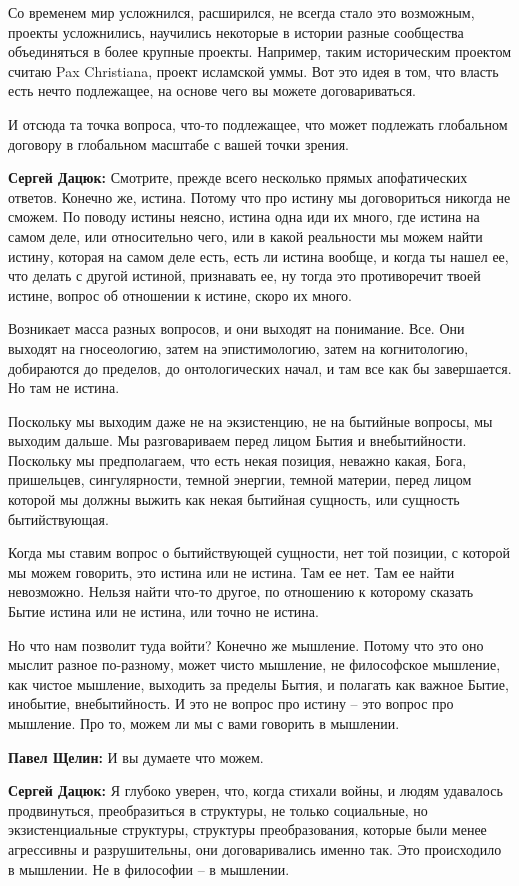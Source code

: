 Со временем мир усложнился, расширился, не всегда стало это возможным, проекты
усложнились, научились некоторые в истории разные сообщества объединяться в
более крупные проекты. Например, таким историческим проектом считаю Pax
Christiana, проект исламской уммы. Вот это идея в том, что власть есть нечто
подлежащее, на основе чего вы можете договариваться.

И отсюда та точка вопроса, что-то подлежащее, что может подлежать глобальном
договору в глобальном масштабе с вашей точки зрения.

\textbf{Сергей Дацюк:} Смотрите, прежде всего несколько прямых апофатических ответов.
Конечно же, истина. Потому что про истину мы договориться никогда не сможем. По
поводу истины неясно, истина одна иди их много, где истина на самом деле, или
относительно чего, или в какой реальности мы можем найти истину, которая на
самом деле есть, есть ли истина вообще, и когда ты нашел ее, что делать с
другой истиной, признавать ее, ну тогда это противоречит твоей истине, вопрос
об отношении к истине, скоро их много.

Возникает масса разных вопросов, и они выходят на понимание. Все. Они выходят
на гносеологию, затем на эпистимологию, затем на когнитологию, добираются до
пределов, до онтологических начал, и там все как бы завершается. Но там не
истина.

Поскольку мы выходим даже не на экзистенцию, не на бытийные вопросы, мы выходим
дальше. Мы разговариваем перед лицом Бытия и внебытийности. Поскольку мы
предполагаем, что есть некая позиция, неважно какая, Бога, пришельцев,
сингулярности, темной энергии, темной материи, перед лицом которой мы должны
выжить как некая бытийная сущность, или сущность бытийствующая.

Когда мы ставим вопрос о бытийствующей сущности, нет той позиции, с которой мы
можем говорить, это истина или не истина. Там ее нет. Там ее найти невозможно.
Нельзя найти что-то другое, по отношению к которому сказать Бытие истина или не
истина, или точно не истина.

Но что нам позволит туда войти? Конечно же мышление. Потому что это оно мыслит
разное по-разному, может чисто мышление, не философское мышление, как чистое
мышление, выходить за пределы Бытия, и полагать как важное Бытие, инобытие,
внебытийность. И это не вопрос про истину – это вопрос про мышление. Про то,
можем ли мы с вами говорить в мышлении.

\textbf{Павел Щелин:} И вы думаете что можем.

\textbf{Сергей Дацюк:} Я глубоко уверен, что, когда стихали войны, и людям удавалось
продвинуться, преобразиться в структуры, не только социальные, но
экзистенциальные структуры, структуры преобразования, которые были менее
агрессивны и разрушительны, они договаривались именно так. Это происходило в
мышлении. Не в философии – в мышлении.

